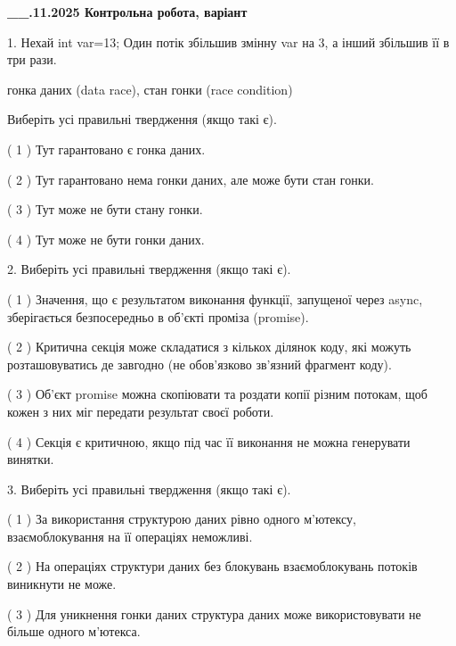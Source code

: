 \documentclass[12pt, ukrainian]{article}
\begin{document}
\newpage
\begin {large}

\textbf{\_\_.11.2025 Контрольна робота, варіант  }\par


{
1. Нехай int var=13; Один потік збільшив змінну var на 3, а інший збільшив її в три рази.

гонка даних (data race), стан гонки (race condition)

Виберіть усі правильні твердження (якщо такі є).\par
\vspace{2mm}
( 1 ) Тут гарантовано є гонка даних.%

( 2 ) Тут гарантовано нема гонки даних, але може бути стан гонки.%

( 3 ) Тут може не бути стану гонки.%

( 4 ) Тут може не бути гонки даних.%


2. Виберіть усі правильні твердження (якщо такі є).\par
\vspace{2mm}

( 1 ) Значення, що є результатом виконання функції, запущеної через async, зберігається безпосередньо в об’єкті проміза (promise).%

( 2 ) Критична секція може складатися з кількох ділянок коду, які можуть розташовуватись де завгодно (не обов’язково зв’язний фрагмент коду).%

( 3 ) Об’єкт promise можна скопіювати та роздати копії різним потокам, щоб кожен з них міг передати результат своєї роботи.%

( 4 ) Секція є критичною, якщо під час її виконання не можна генерувати винятки.%


3. Виберіть усі правильні твердження (якщо такі є).\par
\vspace{2mm}

( 1 ) За використання структурою даних рівно одного м’ютексу, взаємоблокування на її операціях неможливі.%

( 2 ) На операціях структури даних без блокувань взаємоблокувань потоків виникнути не може.%

( 3 ) Для уникнення гонки даних структура даних може використовувати не більше одного м’ютекса.%

}
\end{large}
\end{document}
